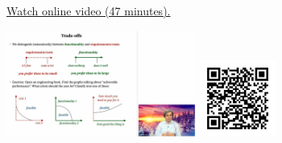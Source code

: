 
\begin{minipage}{10cm}
    \href{https://act4e-spring21.netlify.app/videos/spring2021-tradeoffs:tradeoffs.html}{Watch online video (47 minutes).}
        
    \href{https://act4e-spring21.netlify.app/videos/spring2021-tradeoffs:tradeoffs.html}{\includegraphics[height=3.5cm]{spring2021-tradeoffs:tradeoffs/thumbnails.jpg}}
    \href{https://act4e-spring21.netlify.app/videos/spring2021-tradeoffs:tradeoffs.html}{\includegraphics[height=2.5cm]{spring2021-tradeoffs:tradeoffs/qrcode.png}}
\end{minipage}
